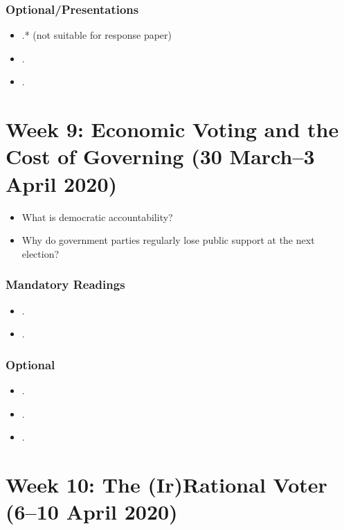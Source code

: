 \documentclass[abstract=on,parskip=full,headings=standardclasses,fontsize=11pt,paper=a4]{scrartcl}
\begin{document}
\subsubsection*{Optional/Presentations}
\begin{itemize}
\item {}.* (not suitable for response paper)
\item {}.
\item {}.
\end{itemize}


\section{Week 9: Economic Voting and the Cost of Governing (30 March--3 April 2020)}


\begin{itemize}
\renewcommand\labelitemi{--}
\item What is democratic accountability?
\item Why do government parties  regularly lose public support at the next election?
\end{itemize}

\subsubsection*{Mandatory Readings}

\begin{itemize}
\item {}.
\item {}.
\end{itemize}

\subsubsection*{Optional}
\begin{itemize}
\item {}.
\item {}.
\item {}.
\end{itemize}

 
\section{Week 10: The (Ir)Rational Voter (6--10 April 2020)}
\end{document}
